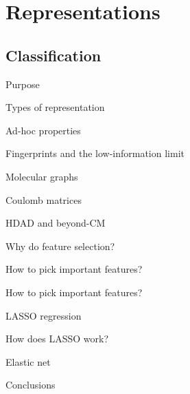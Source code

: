 
\section{Representations}
\subsection{Classification}
\begin{frame}[t]{Purpose}

\end{frame}

\begin{frame}[t]{Types of representation}

\end{frame}
\begin{frame}[t]{Ad-hoc properties}

\end{frame}
\begin{frame}[t]{Fingerprints and the low-information limit}

\end{frame}
\begin{frame}[t]{Molecular graphs}

\end{frame}

\begin{frame}[t]{Coulomb matrices}

\end{frame}
\begin{frame}[t]{HDAD and beyond-CM}

\end{frame}
%
%
\begin{frame}[t]{Why do feature selection?}

\end{frame}
\begin{frame}[t]{How to pick important features?}

\end{frame}
\begin{frame}[t]{How to pick important features?}

\end{frame}
\begin{frame}[t]{LASSO regression}

\end{frame}
\begin{frame}[t]{How does LASSO work?}

\end{frame}
\begin{frame}[t]{Elastic net}

\end{frame}
\begin{frame}[t]{Conclusions}

\end{frame}
